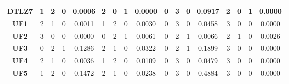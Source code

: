 \begin{table*}[t]
{\begin{tabular}{c|c|c|c|c|c|c|c|c|c|c|c|c|c|c|c|c|}
\multicolumn{1}{|c|}{\textbf{DTLZ7}} & 1                   & 2                     & 0                          & 0.0006          & 2                   & 0                     & 1                          & 0.0000          & 0                   & 3                     & 0                          & 0.0917          & 2                   & 0                     & 1                          & 0.0000          \\ \hline
\multicolumn{1}{|c|}{\textbf{UF1}}   & 2                   & 1                     & 0                          & 0.0011          & 1                   & 2                     & 0                          & 0.0030          & 0                   & 3                     & 0                          & 0.0458          & 3                   & 0                     & 0                          & 0.0000          \\ \hline
\multicolumn{1}{|c|}{\textbf{UF2}}   & 3                   & 0                     & 0                          & 0.0000          & 0                   & 2                     & 1                          & 0.0061          & 0                   & 2                     & 1                          & 0.0066          & 2                   & 1                     & 0                          & 0.0026          \\ \hline
\multicolumn{1}{|c|}{\textbf{UF3}}   & 0                   & 2                     & 1                          & 0.1286          & 2                   & 1                     & 0                          & 0.0322          & 0                   & 2                     & 1                          & 0.1899          & 3                   & 0                     & 0                          & 0.0000          \\ \hline
\multicolumn{1}{|c|}{\textbf{UF4}}   & 2                   & 1                     & 0                          & 0.0036          & 1                   & 2                     & 0                          & 0.0109          & 0                   & 3                     & 0                          & 0.0479          & 3                   & 0                     & 0                          & 0.0000          \\ \hline
\multicolumn{1}{|c|}{\textbf{UF5}}   & 1                   & 2                     & 0                          & 0.1472          & 2                   & 1                     & 0                          & 0.0238          & 0                   & 3                     & 0                          & 0.4884          & 3                   & 0                     & 0                          & 0.0000          \\ \hline

\end{tabular}}
\end{table*}
